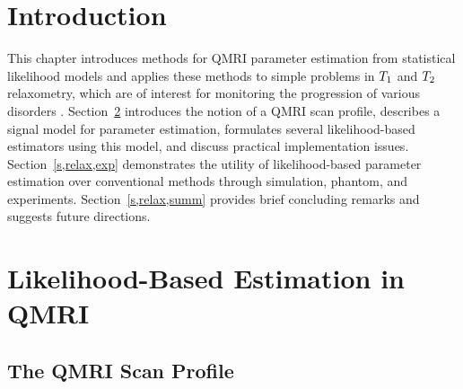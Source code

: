 
\section{Introduction}
\label{s,relax,intro}


This chapter introduces methods
for QMRI parameter estimation
from statistical likelihood models
and applies these methods
to simple problems 
in $T_1$ and $T_2$ relaxometry,
which are of interest
for monitoring the progression
of various disorders \cite{cheng:12:pma}.
Section~\ref{s,relax,meth}
introduces the notion of a QMRI scan profile,
describes a signal model for parameter estimation,
formulates several likelihood-based estimators
using this model,
and discuss practical implementation issues.
Section~\ref{s,relax,exp}
demonstrates the utility
of likelihood-based parameter estimation
over conventional methods
through simulation, phantom, and \invivo experiments.
Section~\ref{s,relax,summ}
provides brief concluding remarks
and suggests future directions.

\section{Likelihood-Based Estimation in QMRI}
\label{s,relax,meth}

\subsection{The QMRI Scan Profile}
\label{ss,relax,meth,prof}

